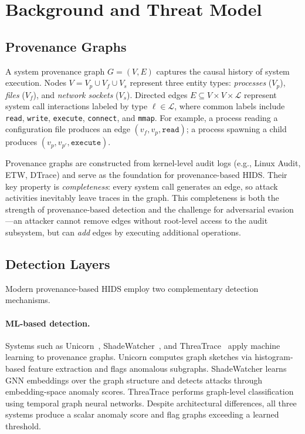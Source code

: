 \section{Background and Threat Model}
\label{sec:background}

\subsection{Provenance Graphs}
\label{sec:bg-provenance}

A system provenance graph $G = (V, E)$ captures the causal history of system execution.
Nodes $V = V_p \cup V_f \cup V_s$ represent three entity types: \emph{processes} ($V_p$), \emph{files} ($V_f$), and \emph{network sockets} ($V_s$).
Directed edges $E \subseteq V \times V \times \mathcal{L}$ represent system call interactions labeled by type $\ell \in \mathcal{L}$, where common labels include \texttt{read}, \texttt{write}, \texttt{execute}, \texttt{connect}, and \texttt{mmap}.
For example, a process reading a configuration file produces an edge $(v_f, v_p, \texttt{read})$; a process spawning a child produces $(v_p, v_{p'}, \texttt{execute})$.

Provenance graphs are constructed from kernel-level audit logs (e.g., Linux Audit, ETW, DTrace) and serve as the foundation for provenance-based HIDS.
Their key property is \emph{completeness}: every system call generates an edge, so attack activities inevitably leave traces in the graph.
This completeness is both the strength of provenance-based detection and the challenge for adversarial evasion---an attacker cannot remove edges without root-level access to the audit subsystem, but can \emph{add} edges by executing additional operations.

\subsection{Detection Layers}
\label{sec:bg-detection}

Modern provenance-based HIDS employ two complementary detection mechanisms.

\paragraph{ML-based detection.}
Systems such as Unicorn~\cite{unicorn}, ShadeWatcher~\cite{shadewatcher}, and ThreaTrace~\cite{threatrace} apply machine learning to provenance graphs.
Unicorn computes graph sketches via histogram-based feature extraction and flags anomalous subgraphs.
ShadeWatcher learns GNN embeddings over the graph structure and detects attacks through embedding-space anomaly scores.
ThreaTrace performs graph-level classification using temporal graph neural networks.
Despite architectural differences, all three systems produce a scalar anomaly score and flag graphs exceeding a learned threshold.


